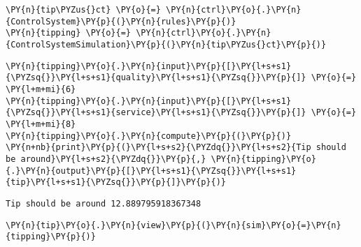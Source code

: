     \begin{tcolorbox}[breakable, size=fbox, boxrule=1pt, pad at break*=1mm,colback=cellbackground, colframe=cellborder]
\begin{Verbatim}[commandchars=\\\{\}]
\PY{n}{tip\PYZus{}ct} \PY{o}{=} \PY{n}{ctrl}\PY{o}{.}\PY{n}{ControlSystem}\PY{p}{(}\PY{n}{rules}\PY{p}{)}
\PY{n}{tipping} \PY{o}{=} \PY{n}{ctrl}\PY{o}{.}\PY{n}{ControlSystemSimulation}\PY{p}{(}\PY{n}{tip\PYZus{}ct}\PY{p}{)}
\end{Verbatim}
\end{tcolorbox}

    \begin{tcolorbox}[breakable, size=fbox, boxrule=1pt, pad at break*=1mm,colback=cellbackground, colframe=cellborder]
\begin{Verbatim}[commandchars=\\\{\}]
\PY{n}{tipping}\PY{o}{.}\PY{n}{input}\PY{p}{[}\PY{l+s+s1}{\PYZsq{}}\PY{l+s+s1}{quality}\PY{l+s+s1}{\PYZsq{}}\PY{p}{]} \PY{o}{=} \PY{l+m+mi}{6}
\PY{n}{tipping}\PY{o}{.}\PY{n}{input}\PY{p}{[}\PY{l+s+s1}{\PYZsq{}}\PY{l+s+s1}{service}\PY{l+s+s1}{\PYZsq{}}\PY{p}{]} \PY{o}{=} \PY{l+m+mi}{8}
\PY{n}{tipping}\PY{o}{.}\PY{n}{compute}\PY{p}{(}\PY{p}{)}
\PY{n+nb}{print}\PY{p}{(}\PY{l+s+s2}{\PYZdq{}}\PY{l+s+s2}{Tip should be around}\PY{l+s+s2}{\PYZdq{}}\PY{p}{,} \PY{n}{tipping}\PY{o}{.}\PY{n}{output}\PY{p}{[}\PY{l+s+s1}{\PYZsq{}}\PY{l+s+s1}{tip}\PY{l+s+s1}{\PYZsq{}}\PY{p}{]}\PY{p}{)}
\end{Verbatim}
\end{tcolorbox}

    \begin{Verbatim}[commandchars=\\\{\}]
Tip should be around 12.889795918367348
    \end{Verbatim}

    \begin{tcolorbox}[breakable, size=fbox, boxrule=1pt, pad at break*=1mm,colback=cellbackground, colframe=cellborder]
\begin{Verbatim}[commandchars=\\\{\}]
\PY{n}{tip}\PY{o}{.}\PY{n}{view}\PY{p}{(}\PY{n}{sim}\PY{o}{=}\PY{n}{tipping}\PY{p}{)}
\end{Verbatim}
\end{tcolorbox}
    \begin{center}
    \end{center}
    { \hspace*{\fill} \\}